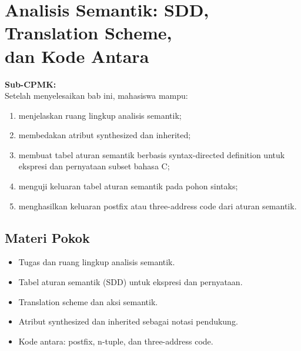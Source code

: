 \documentclass[../../main.tex]{subfiles}
\begin{document}
\chapter[Analisis Semantik]{Analisis Semantik: SDD, Translation Scheme,\\ dan Kode Antara}
\label{chap:semantik}

\begin{outcomebox}
\textbf{Sub-CPMK:} \\[3pt]
Setelah menyelesaikan bab ini, mahasiswa mampu:
\begin{enumerate}[label=\arabic*.,leftmargin=*]
  \item menjelaskan ruang lingkup analisis semantik;
  \item membedakan atribut synthesized dan inherited;
  \item membuat tabel aturan semantik berbasis syntax-directed
        definition untuk ekspresi dan pernyataan subset bahasa C;
  \item menguji keluaran tabel aturan semantik pada pohon sintaks;
  \item menghasilkan keluaran postfix atau three-address code dari
        aturan semantik.
\end{enumerate}
\end{outcomebox}

\section*{Materi Pokok}
\begin{itemize}[leftmargin=*]
  \item Tugas dan ruang lingkup analisis semantik.
  \item Tabel aturan semantik (SDD) untuk ekspresi dan pernyataan.
  \item Translation scheme dan aksi semantik.
  \item Atribut synthesized dan inherited sebagai notasi pendukung.
  \item Kode antara: postfix, n-tuple, dan three-address code.
\end{itemize}















\ifSubfilesClassLoaded{%
}{}
\end{document}
